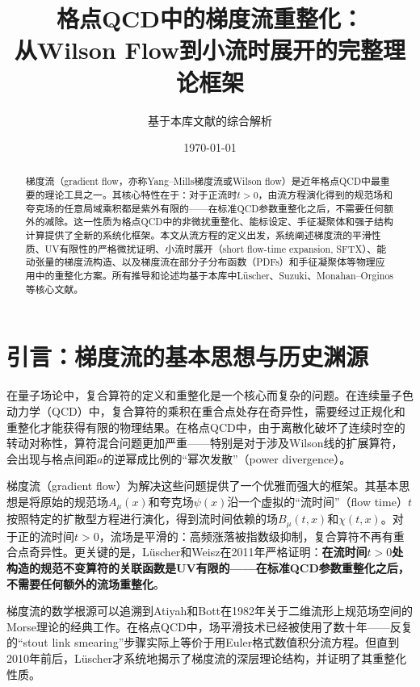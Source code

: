 \documentclass[12pt,a4paper]{ctexart}
\title{\heiti 格点QCD中的梯度流重整化：\\
从Wilson Flow到小流时展开的完整理论框架}
\author{基于本库文献的综合解析}
\date{\today}
\theoremstyle{definition}
\begin{document}
\maketitle

\begin{abstract}
\noindent
梯度流（gradient flow，亦称Yang--Mills梯度流或Wilson flow）是近年格点QCD中最重要的理论工具之一。其核心特性在于：对于正流时$t > 0$，由流方程演化得到的规范场和夸克场的任意局域乘积都是紫外有限的——在标准QCD参数重整化之后，不需要任何额外的减除。这一性质为格点QCD中的非微扰重整化、能标设定、手征凝聚体和强子结构计算提供了全新的系统化框架。本文从流方程的定义出发，系统阐述梯度流的平滑性质、UV有限性的严格微扰证明、小流时展开（short flow-time expansion, SFTX）、能动张量的梯度流构造、以及梯度流在部分子分布函数（PDFs）和手征凝聚体等物理应用中的重整化方案。所有推导和论述均基于本库中L\"uscher、Suzuki、Monahan--Orginos等核心文献。
\end{abstract}

\tableofcontents
\newpage

\section{引言：梯度流的基本思想与历史渊源}

在量子场论中，复合算符的定义和重整化是一个核心而复杂的问题。在连续量子色动力学（QCD）中，复合算符的乘积在重合点处存在奇异性，需要经过正规化和重整化才能获得有限的物理结果。在格点QCD中，由于离散化破坏了连续时空的转动对称性，算符混合问题更加严重——特别是对于涉及Wilson线的扩展算符，会出现与格点间距$a$的逆幂成比例的``幂次发散''（power divergence）。

梯度流（gradient flow）为解决这些问题提供了一个优雅而强大的框架。其基本思想是将原始的规范场$A_\mu(x)$和夸克场$\psi(x)$沿一个虚拟的``流时间''（flow time）$t$按照特定的扩散型方程进行演化，得到流时间依赖的场$B_\mu(t,x)$和$\chi(t,x)$。对于正的流时间$t > 0$，流场是平滑的：高频涨落被指数级抑制，复合算符不再有重合点奇异性。更关键的是，L\"uscher和Weisz在2011年严格证明\cite{LuscherWeisz2011}：\textbf{在流时间$t > 0$处构造的规范不变算符的关联函数是UV有限的——在标准QCD参数重整化之后，不需要任何额外的流场重整化}。

梯度流的数学根源可以追溯到Atiyah和Bott在1982年关于二维流形上规范场空间的Morse理论的经典工作\cite{Luscher2014}。在格点QCD中，场平滑技术已经被使用了数十年——反复的``stout link smearing''步骤实际上等价于用Euler格式数值积分流方程。但直到2010年前后，L\"uscher才系统地揭示了梯度流的深层理论结构，并证明了其重整化性质\cite{Luscher2010,LuscherWeisz2011}。
\end{document}
